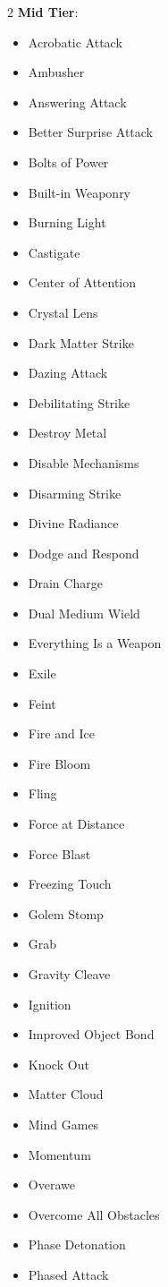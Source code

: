 \begin{multicols}{2}
\textbf{Mid Tier}:

\begin{itemize}
\item Acrobatic Attack
\item Ambusher
\item Answering Attack
\item Better Surprise Attack
\item Bolts of Power
\item Built-in Weaponry
\item Burning Light
\item Castigate
\item Center of Attention
\item Crystal Lens
\item Dark Matter Strike
\item Dazing Attack
\item Debilitating Strike
\item Destroy Metal
\item Disable Mechanisms
\item Disarming Strike
\item Divine Radiance
\item Dodge and Respond
\item Drain Charge
\item Dual Medium Wield
\item Everything Is a Weapon
\item Exile
\item Feint
\item Fire and Ice
\item Fire Bloom
\item Fling
\item Force at Distance
\item Force Blast
\item Freezing Touch
\item Golem Stomp
\item Grab
\item Gravity Cleave
\item Ignition
\item Improved Object Bond
\item Knock Out
\item Matter Cloud
\item Mind Games
\item Momentum
\item Overawe
\item Overcome All Obstacles
\item Phase Detonation
\item Phased Attack

\end{itemize}
\end{multicols}
